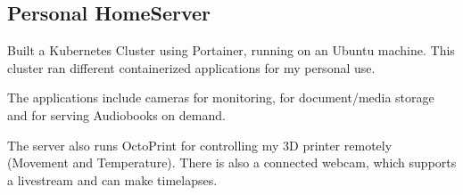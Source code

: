 \documentclass[]{plushcv}
\begin{document}
\begin{minipage}[t]{0.8\textwidth}
\subsection{Personal HomeServer}
\begin{tightemize}
\item[\textbullet{}] Built a Kubernetes Cluster using Portainer, running on an Ubuntu machine. This cluster ran different containerized applications for my personal use. 
\item[\textbullet{}] The applications include cameras for monitoring, for document/media storage and for serving Audiobooks on demand.
\item[\textbullet{}] The server also runs OctoPrint for controlling my 3D printer remotely (Movement and Temperature). There is also a connected webcam, which supports a livestream and can make timelapses.
\end{tightemize}
\sectionsep


%
%

\end{minipage} 
\hfill
\end{document}
